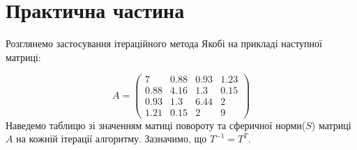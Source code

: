 \section*{\centering Практична частина}

Розглянемо застосування ітераційного
метода Якобі на прикладі наступної матриці:

\[
    A = \begin{pmatrix}
        7 & 0.88 & 0.93 & 1.23 \\
        0.88 & 4.16 & 1.3 & 0.15 \\
        0.93 & 1.3 & 6.44 & 2 \\
        1.21 & 0.15 & 2 & 9
    \end{pmatrix}
\]
Наведемо таблицю зі значенням матиці повороту та сферичної норми($S$) матриці $A$
на кожній ітерації алгоритму. Зазначимо, що $T^{-1}=T^T$.

